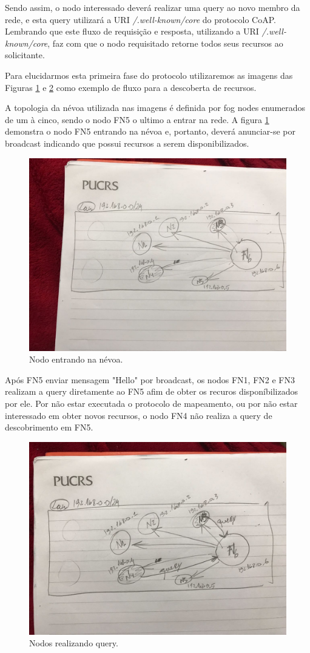 Sendo assim, o nodo interessado deverá realizar uma query ao novo membro da rede, e esta query utilizará a URI \textit{/.well-known/core} do protocolo CoAP.
Lembrando que este fluxo de requisição e resposta, utilizando a URI \textit{/.well-known/core}, faz com que o nodo requisitado retorne todos seus recursos ao solicitante.

Para elucidarmos esta primeira fase do protocolo utilizaremos as imagens das Figuras \ref{fig:fig5} e \ref{fig:fig6} como exemplo de fluxo para a descoberta de recursos.

A topologia da névoa utilizada nas imagens é definida por fog nodes enumerados de um à cinco, sendo o nodo FN5 o ultimo a entrar na rede.
A figura \ref{fig:fig5} demonstra o nodo FN5 entrando na névoa e, portanto, deverá anunciar-se por broadcast indicando que possui recursos a serem disponibilizados.

\begin{figure}[htb!]
    \centering\includegraphics[width=.75\textwidth]{fig5.jpeg}
    \caption%
    {\label{fig:fig5} Nodo entrando na névoa.}
\end{figure}

Após FN5 enviar mensagem  "Hello" por broadcast, os nodos FN1, FN2 e FN3 realizam a query diretamente ao FN5 afim de obter os recuros disponíbilizados por ele.
Por não estar executada o protocolo de mapeamento, ou por não estar interessado em obter novos recursos, o nodo FN4 não realiza a query de descobrimento em FN5.


\begin{figure}[htb!]
    \centering\includegraphics[width=.75\textwidth]{fig6.jpeg}
    \caption%
    {\label{fig:fig6} Nodos realizando query.}
\end{figure}

